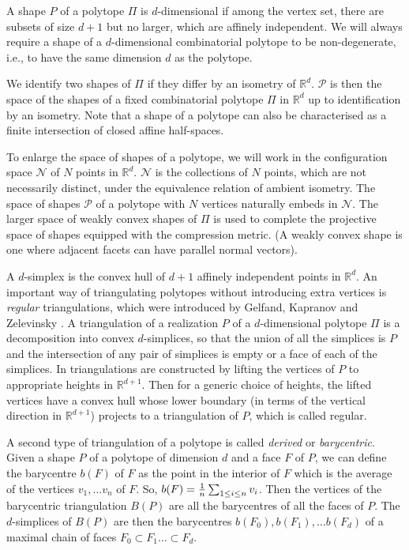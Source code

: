\documentclass[a4paper, 12pt]{amsart}
\theoremstyle{plain}
\begin{document}
A shape $P$ of a polytope $\Pi$ is $d$-dimensional if among the vertex set, there are subsets of size $d+1$ but no larger, which are affinely independent. We will always require a shape of a $d$-dimensional combinatorial polytope to be non-degenerate, i.e., to have the same dimension $d$ as the polytope.

We identify two shapes of $\Pi$ if they differ by an isometry of $\mathbb{R}^d$. $\mathcal P$ is then the space of the shapes of a fixed combinatorial polytope $\Pi$ in $\mathbb{R}^d$ up to identification by an isometry.  Note that a shape of a polytope can also be characterised as a finite intersection of closed affine half-spaces. 

To enlarge the space of shapes of a polytope, we will work in the configuration space $\mathcal N$ of $N$ points in $\mathbb{R}^{d}$. $\mathcal N$ is the collections of $N$ points, which are not necessarily distinct, under the equivalence relation of ambient isometry. The space of shapes $\mathcal P$ of a polytope with $N$ vertices naturally embeds in $\mathcal N$. The larger space of weakly convex shapes of $\Pi$ is used to complete the projective space of shapes equipped with the compression metric. 
(A weakly convex shape is one where adjacent facets can have parallel normal vectors).

A $d$-simplex is the convex hull of $d+1$ affinely independent points in $\mathbb{R}^d$. An important way of triangulating polytopes without introducing extra vertices is  {\it regular} triangulations, which were introduced by Gelfand, Kapranov and Zelevinsky \cite{gelfand}. A triangulation of a realization $P$ of a $d$-dimensional polytope $\Pi$ is a decomposition into convex $d$-simplices, so that the union of all the simplices is $P$ and the intersection of any pair of simplices is empty or a face of each of the simplices. In \cite{gelfand} triangulations are constructed by lifting the vertices of $P$ to appropriate heights in $\mathbb{R}^{d+1}$. Then for a generic choice of heights, the lifted vertices have a convex hull whose lower boundary (in terms of the vertical direction in $\mathbb{R}^{d+1}$) projects to a triangulation of $P$, which is called regular. 

A second type of triangulation of a polytope is called {\it derived} or {\it barycentric}. Given a shape $P$ of a polytope of dimension $d$ and a face $F$ of $P$, we can define the barycentre $b(F)$ of $F$ as the point in the interior of $F$ which is the average of the vertices $v_1, \dots v_n$ of $F$. So, $b(F)= {1 \over n} \sum_{ 1 \le i \le n}  v_i$. Then the vertices of the barycentric triangulation $B(P)$ are all the barycentres of all the faces of $P$. The $d$-simplices of $B(P)$ are then the barycentres $b(F_0), b(F_1), \dots b(F_d)$ of a maximal chain of faces $F_0 \subset F_1 \dots \subset F_d$. 
\end{document}
